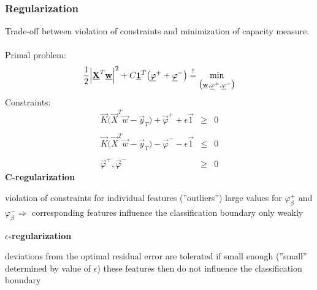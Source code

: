 
\subsubsection{Regularization}
Trade-off between violation of constraints and minimization of capacity measure.
\\\\
Primal problem:
\begin{equation}
	\frac{1}{2} \Big| \underline{\mathbf{X}}^T \underline{\mathbf{w}} \Big|^2 + C \underline{\mathbf{1}}^T 
	\big( \underline{\mathbf{\varphi}}^+ + \underline{\mathbf{\varphi}}^- \big) \stackrel{\mathrm{!}}{=}
	\min_{\big( \underline{\mathbf{w}}, \underline{\mathbf{\varphi}}^+, \underline{\mathbf{\varphi}}^- \big)}
\end{equation}
Constraints:
\begin{equation} 
	\begin{array}{rll}
		\vec{K} \Big( \vec{X}^T \vec{w} - \vec{y}_T \Big) 
			+ \vec{\varphi}^+ + \epsilon \vec{1} 
		& \geq & 0 \\\\
		\vec{K} \Big( \vec{X}^T \vec{w} - \vec{y}_T \Big) 
			- \vec{\varphi}^- - \epsilon \vec{1} 
		& \leq & 0 \\\\
		\vec{\varphi}^+, \vec{\varphi}^- 
		& \geq & 0
	\end{array}
\end{equation}
{\bf C-regularization}
\begin{itemize}
	\itl violation of constraints for individual features (''outliers'')
	\itl large values for $\varphi_\beta^+$ and $\varphi_\beta^-
		\Rightarrow$ corresponding features influence the 
		classification boundary only weakly
\end{itemize}
{\bf $\epsilon$-regularization}
\begin{itemize}
	\itl deviations from the optimal residual error are tolerated if small
		enough (''small'' determined by value of $\epsilon$)
	\itl these features then do not influence the classification boundary
\end{itemize}


